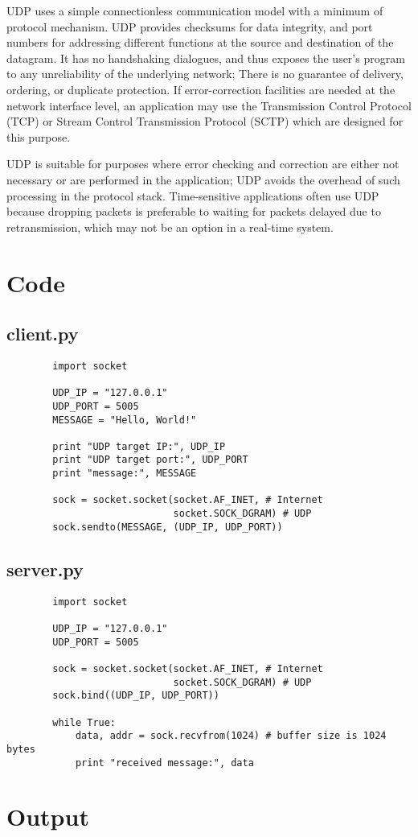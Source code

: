 \documentclass[a4paper,12pt]{article}
\begin{document}
    UDP uses a simple connectionless communication model with a minimum of protocol mechanism. UDP provides checksums for data integrity, and port numbers for addressing different functions at the source and destination of the datagram. It has no handshaking dialogues, and thus exposes the user's program to any unreliability of the underlying network; There is no guarantee of delivery, ordering, or duplicate protection. If error-correction facilities are needed at the network interface level, an application may use the Transmission Control Protocol (TCP) or Stream Control Transmission Protocol (SCTP) which are designed for this purpose.
    
    UDP is suitable for purposes where error checking and correction are either not necessary or are performed in the application; UDP avoids the overhead of such processing in the protocol stack. Time-sensitive applications often use UDP because dropping packets is preferable to waiting for packets delayed due to retransmission, which may not be an option in a real-time system.    
    \section{Code} 
    \subsection{client.py}
    \begin{verbatim}
        import socket

        UDP_IP = "127.0.0.1"
        UDP_PORT = 5005
        MESSAGE = "Hello, World!"
        
        print "UDP target IP:", UDP_IP
        print "UDP target port:", UDP_PORT
        print "message:", MESSAGE
        
        sock = socket.socket(socket.AF_INET, # Internet
                             socket.SOCK_DGRAM) # UDP
        sock.sendto(MESSAGE, (UDP_IP, UDP_PORT))
    \end{verbatim}
    \subsection{server.py}
    \begin{verbatim}
        import socket

        UDP_IP = "127.0.0.1"
        UDP_PORT = 5005
        
        sock = socket.socket(socket.AF_INET, # Internet
                             socket.SOCK_DGRAM) # UDP
        sock.bind((UDP_IP, UDP_PORT))
        
        while True:
            data, addr = sock.recvfrom(1024) # buffer size is 1024 bytes
            print "received message:", data
    \end{verbatim}
    
    \section{Output}
    
    
\end{document}
